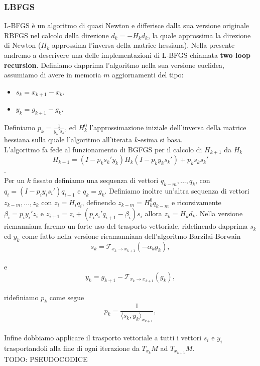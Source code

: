 \documentclass[a4paper, 12pt]{article}
\begin{document}
\subsubsection{LBFGS}
L-BFGS è un algoritmo di quasi Newton e differisce dalla sua versione originale RBFGS nel calcolo della direzione $d_k = -H_kd_k$, la quale approssima la direzione di Newton ($H_k$ approssima l'inversa della matrice hessiana). Nella presente andremo a descrivere una delle implementazioni di L-BFGS chiamata \textbf{two loop recursion}. Definiamo dapprima l'algoritmo nella sua versione euclidea, assumiamo di avere in memoria $m$ aggiornamenti del tipo:\\
\begin{itemize}
    \item $s_k = x_{k+1} - x_k$.
    \item $y_k = g_{k+1} - g_k$.
\end{itemize}
Definiamo $p_k = \frac{1}{y_k's_k}$, ed $H_k^0$ l'approssimazione iniziale dell'inversa della matrice hessiana sulla quale l'algoritmo all'iterata $k$-esima si basa.\\
L'algoritmo fa fede al funzionamento di BGFGS per il calcolo di $H_{k+1}$ da $H_k$\\
\[H_{k+1} = (I - p_ks_k'y_k)H_k(I - p_ky_ks_k') + p_ks_ks_k'\].\\
Per un $k$ fissato definiamo una sequenza di vettori $q_{k-m}, ..., q_k$, con $q_i = (I - p_iy_is_i')q_{i+1}$ e $q_k = g_k$. Definiamo inoltre un'altra sequenza di vettori $z_{k-m}, ..., z_k$ con $z_i = H_iq_i$, definendo $z_{k-m} = H_k^0q_{k-m}$ e ricorsivamente $\beta_i = p_iy_i'z_i$ e $z_{i+1} = z_i + (p_is_i'q_{i+1} - \beta_i)s_i$ allora $z_k = H_kd_k$.
Nella versione riemanniana faremo un forte uso del trasporto vettoriale, ridefinendo dapprima $s_k$ ed $y_k$ come fatto nella versione rieamanniana dell'algoritmo Barzilai-Borwain\\
\[s_k = \mathcal{T}_{x_k \to x_{k+1}}(-\alpha_kg_k),\]\\
e\\
\[y_k = g_{k+1} - \mathcal{T}_{x_k \to x_{k+1}}(g_k),\]\\
ridefiniamo $p_k$ come segue\\
\[p_k = \frac{1}{\langle s_k,y_k \rangle_{x_{k+1}}},\]\\
Infine dobbiamo applicare il trasporto vettoriale a tutti i vettori $s_i$ e $y_i$ trasportandoli alla fine di ogni iterazione da $T_{x_k}M$ ad $T_{x_{k+1}}M$.\\
TODO: PSEUDOCODICE
\end{document}
